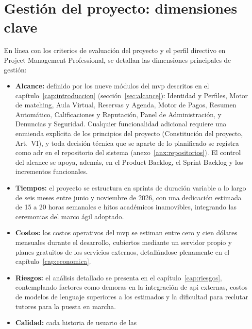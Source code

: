 \section{Gestión del proyecto: dimensiones clave}\label{sec:dimensiones}

En línea con los criterios de evaluación del proyecto y el perfil
directivo en Project Management Professional, se detallan las
dimensiones principales de gestión:

\begin{itemize}
    \item \textbf{Alcance:} definido por los nueve módulos del \gls{mvp}
          descritos en el capítulo~\ref{cap:introduccion}
          (sección~\ref{sec:alcance}): Identidad y Perfiles, Motor de
          \gls{matching}, Aula Virtual, Reservas y Agenda, Motor de Pagos,
          Resumen Automático, Calificaciones y Reputación, Panel de
          Administración, y Denuncias y Seguridad. Cualquier
          funcionalidad adicional requiere una enmienda explícita de los
          principios del proyecto (Constitución del proyecto, Art.~VI), y
          toda decisión técnica que se aparte de lo planificado se
          registra como \gls{adr} en el repositorio del sistema
          (anexo~\ref{anx:repositorios}). El control del alcance se
          apoya, además, en el Product Backlog, el Sprint Backlog y los
          incrementos funcionales.
    \item \textbf{Tiempos:} el proyecto se estructura en sprints de
          duración variable a lo largo de seis meses entre junio y
          noviembre de 2026, con una dedicación estimada de 15 a 20 horas
          semanales e hitos académicos inamovibles, integrando las
          ceremonias del marco ágil adoptado.
    \item \textbf{Costos:} los costos operativos del \gls{mvp} se estiman
          entre cero y cien dólares mensuales durante el desarrollo,
          cubiertos mediante un servidor propio y planes gratuitos de los
          servicios externos, detallándose plenamente en el
          capítulo~\ref{cap:economica}.
    \item \textbf{Riesgos:} el análisis detallado se presenta en el
          capítulo~\ref{cap:riesgos}, contemplando factores como demoras
          en la integración de \gls{api} externas, costos de modelos de
          lenguaje superiores a los estimados y la dificultad para
          reclutar tutores para la puesta en marcha.
    \item \textbf{Calidad:} cada historia de usuario de las

\end{itemize}
